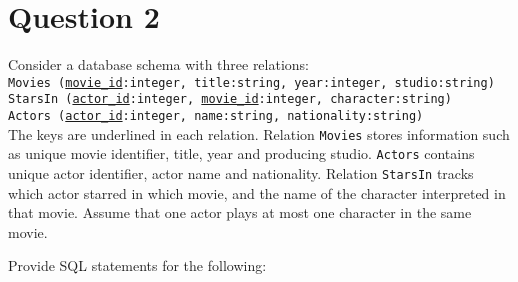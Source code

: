 
\section*{Question 2}

Consider a database schema with three relations:\\

\texttt{Movies (\underline{movie\_id}:integer, title:string, year:integer, studio:string)}\\
\texttt{StarsIn (\underline{actor\_id}:integer, \underline{movie\_id}:integer, character:string)}\\
\texttt{Actors (\underline{actor\_id}:integer, name:string, nationality:string)}\\

The keys are underlined in each relation. Relation \texttt{Movies} stores information such as unique movie identifier, title, year and  producing studio. \texttt{Actors} contains unique actor identifier, actor name and nationality. Relation \texttt{StarsIn} tracks which actor starred in which movie, and the name of the character interpreted in that movie. Assume that one actor plays at most one character in the  same movie.

Provide SQL statements for the following:
 
